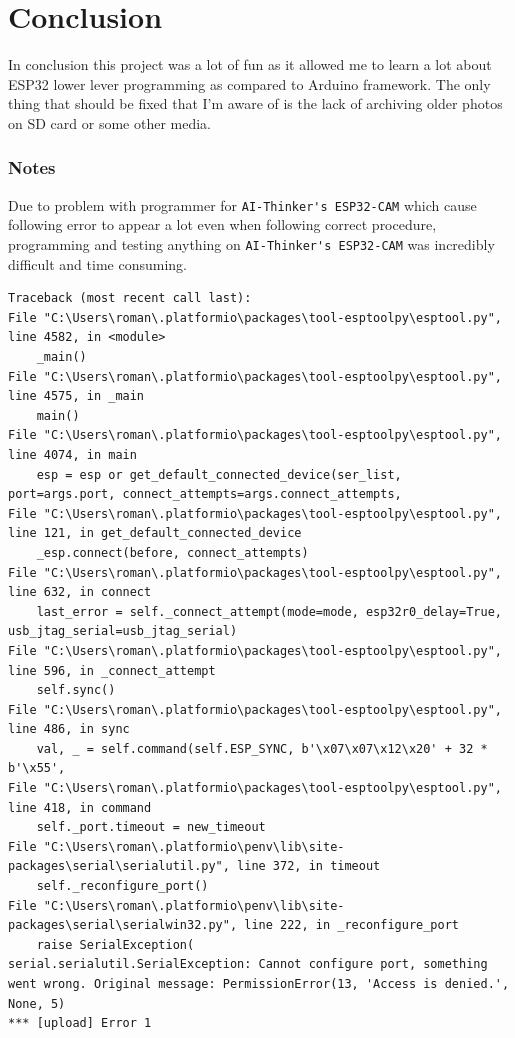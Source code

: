 \documentclass{article}
\begin{document}
    \clearpage
    \section{Conclusion}
    In conclusion this project was a lot of fun as it allowed me to learn a lot about 
    ESP32 lower lever programming as compared to Arduino framework.
    The only thing that should be fixed that I'm aware of is the lack of archiving older photos on SD card or some other media.
    
    \subsubsection{Notes}
    Due to problem with programmer for \verb|AI-Thinker's ESP32-CAM| which cause following error to appear a lot even 
    when following correct procedure, programming and testing anything on \verb|AI-Thinker's ESP32-CAM| was incredibly difficult and time consuming.
    \begin{lstlisting}
Traceback (most recent call last):
File "C:\Users\roman\.platformio\packages\tool-esptoolpy\esptool.py", line 4582, in <module>
    _main()
File "C:\Users\roman\.platformio\packages\tool-esptoolpy\esptool.py", line 4575, in _main
    main()
File "C:\Users\roman\.platformio\packages\tool-esptoolpy\esptool.py", line 4074, in main
    esp = esp or get_default_connected_device(ser_list, port=args.port, connect_attempts=args.connect_attempts,
File "C:\Users\roman\.platformio\packages\tool-esptoolpy\esptool.py", line 121, in get_default_connected_device
    _esp.connect(before, connect_attempts)
File "C:\Users\roman\.platformio\packages\tool-esptoolpy\esptool.py", line 632, in connect
    last_error = self._connect_attempt(mode=mode, esp32r0_delay=True, usb_jtag_serial=usb_jtag_serial)
File "C:\Users\roman\.platformio\packages\tool-esptoolpy\esptool.py", line 596, in _connect_attempt
    self.sync()
File "C:\Users\roman\.platformio\packages\tool-esptoolpy\esptool.py", line 486, in sync
    val, _ = self.command(self.ESP_SYNC, b'\x07\x07\x12\x20' + 32 * b'\x55',
File "C:\Users\roman\.platformio\packages\tool-esptoolpy\esptool.py", line 418, in command
    self._port.timeout = new_timeout
File "C:\Users\roman\.platformio\penv\lib\site-packages\serial\serialutil.py", line 372, in timeout
    self._reconfigure_port()
File "C:\Users\roman\.platformio\penv\lib\site-packages\serial\serialwin32.py", line 222, in _reconfigure_port
    raise SerialException(
serial.serialutil.SerialException: Cannot configure port, something went wrong. Original message: PermissionError(13, 'Access is denied.', None, 5)
*** [upload] Error 1
    \end{lstlisting}
    
\end{document}
